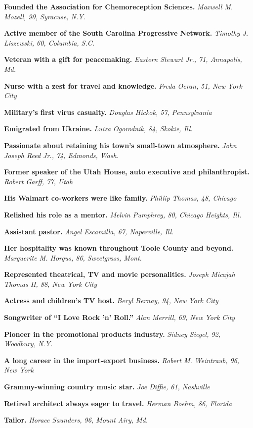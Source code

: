 \textbf{Founded the Association for Chemoreception Sciences.}
\emph{Maxwell M. Mozell, 90, Syracuse, N.Y.}

\textbf{Active member of the South Carolina Progressive Network.}
\emph{Timothy J. Liszewski, 60, Columbia, S.C.}

\textbf{Veteran with a gift for peacemaking.} \emph{Eastern Stewart Jr.,
71, Annapolis, Md.}

\textbf{Nurse with a zest for travel and knowledge.} \emph{Freda Ocran,
51, New York City}

\textbf{Military's first virus casualty.} \emph{Douglas Hickok, 57,
Pennsylvania}

\textbf{Emigrated from Ukraine.} \emph{Luiza Ogorodnik, 84, Skokie,
Ill.}

\textbf{Passionate about retaining his town's small-town atmosphere.}
\emph{John Joseph Reed Jr., 74, Edmonds, Wash.}

\textbf{Former speaker of the Utah House, auto executive and
philanthropist.} \emph{Robert Garff, 77, Utah}

\textbf{His Walmart co-workers were like family.} \emph{Phillip Thomas,
48, Chicago}

\textbf{Relished his role as a mentor.} \emph{Melvin Pumphrey, 80,
Chicago Heights, Ill.}

\textbf{Assistant pastor.} \emph{Angel Escamilla, 67, Naperville, Ill.}

\textbf{Her hospitality was known throughout Toole County and beyond.}
\emph{Marguerite M. Horgus, 86, Sweetgrass, Mont.}

\textbf{Represented theatrical, TV and movie personalities.}
\emph{Joseph Micajah Thomas II, 88, New York City}

\textbf{Actress and children's TV host.} \emph{Beryl Bernay, 94, New
York City}

\textbf{Songwriter of ``I Love Rock 'n' Roll.''} \emph{Alan Merrill, 69,
New York City}

\textbf{Pioneer in the promotional products industry.} \emph{Sidney
Siegel, 92, Woodbury, N.Y.}

\textbf{A long career in the import-export business.} \emph{Robert M.
Weintraub, 96, New York}

\textbf{Grammy-winning country music star.} \emph{Joe Diffie, 61,
Nashville}

\textbf{Retired architect always eager to travel.} \emph{Herman Boehm,
86, Florida}

\textbf{Tailor.} \emph{Horace Saunders, 96, Mount Airy, Md.}

